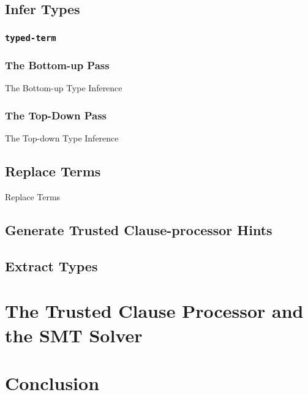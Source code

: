 \subsection{Infer Types}

\subsubsection{\texttt{typed-term}}

\subsubsection{The Bottom-up Pass}

\begin{algorithm}
  \caption{The Bottom-up Type Inference}\label{alg:bottomup}
\end{algorithm}

\subsubsection{The Top-Down Pass}

\begin{algorithm}
  \caption{The Top-down Type Inference}\label{alg:topdown}
\end{algorithm}

\subsection{Replace Terms}

\begin{algorithm}
  \caption{Replace Terms}\label{alg:replace}
\end{algorithm}

\subsection{Generate Trusted Clause-processor Hints}

\subsection{Extract Types}

\section{The Trusted Clause Processor and the SMT Solver}

\section{Conclusion}
